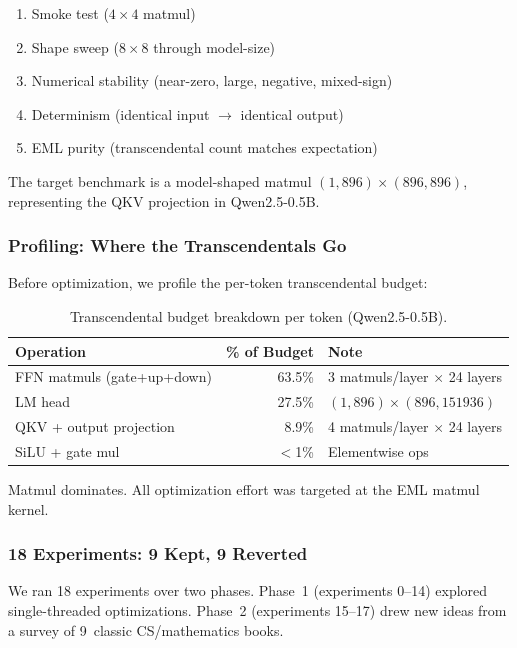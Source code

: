 \documentclass[acmsmall,nonacm]{acmart}
\begin{document}
\begin{enumerate}
\item Smoke test ($4\times4$ matmul)
\item Shape sweep ($8\times8$ through model-size)
\item Numerical stability (near-zero, large, negative, mixed-sign)
\item Determinism (identical input $\to$ identical output)
\item EML purity (transcendental count matches expectation)
\end{enumerate}

The target benchmark is a model-shaped matmul $(1, 896) \times
(896, 896)$, representing the QKV projection in Qwen2.5-0.5B.

\subsubsection{Profiling: Where the Transcendentals Go}

Before optimization, we profile the per-token transcendental budget:

\begin{table}[h]
\caption{Transcendental budget breakdown per token (Qwen2.5-0.5B).}
\label{tab:budget}
\centering
\begin{tabular}{lrl}
\toprule
\textbf{Operation} & \textbf{\% of Budget} & \textbf{Note} \\
\midrule
FFN matmuls (gate+up+down) & 63.5\%  & 3 matmuls/layer $\times$ 24 layers \\
LM head                    & 27.5\%  & $(1,896) \times (896, 151936)$ \\
QKV + output projection    & 8.9\%   & 4 matmuls/layer $\times$ 24 layers \\
SiLU + gate mul            & $<$1\%  & Elementwise ops \\
\bottomrule
\end{tabular}
\end{table}

Matmul dominates.  All optimization effort was targeted at the
EML matmul kernel.

\subsubsection{18 Experiments: 9 Kept, 9 Reverted}

We ran 18 experiments over two phases.  Phase~1 (experiments 0--14)
explored single-threaded optimizations.  Phase~2 (experiments 15--17)
drew new ideas from a survey of 9~classic CS/mathematics books.
\end{document}
